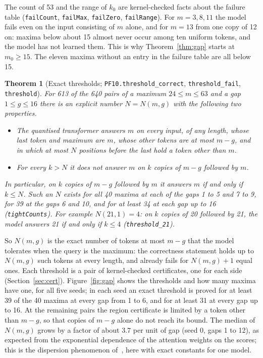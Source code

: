 \documentclass[11pt,a4paper]{article}
\newtheorem{theorem}{Theorem}
\newcommand{\lean}[1]{\texttt{#1}}
\begin{document}
The count of 53 and the range of $k_0$ are kernel-checked facts about the
failure table (\lean{failCount}, \lean{failMax}, \lean{failZero},
\lean{failRange}). For $m=3,8,11$ the model fails even on the input consisting
of $m$ alone, and for $m=13$ from one copy of 12 on: maxima below about 15
almost never occur among ten uniform tokens, and the model has not learned
them. This is why Theorem~\ref{thm:gap} starts at $m_0\ge15$. The eleven maxima
without an entry in the failure table are all below 15.

\begin{theorem}[Exact thresholds; \lean{PF10.threshold\_correct}, \lean{threshold\_fail}, \lean{threshold}]\label{thm:tight}
For 613 of the 640 pairs of a maximum $24\le m\le63$ and a gap $1\le g\le16$
there is an explicit number $N=N(m,g)$ with the following two properties.
\begin{itemize}
\item The quantised transformer answers $m$ on every input, of any length, whose
last token and maximum are $m$, whose other tokens are at most $m-g$, and in
which at most $N$ positions before the last hold a token other than $m$.
\item For every $k>N$ it does not answer $m$ on $k$ copies of $m-g$ followed by
$m$.
\end{itemize}
In particular, on $k$ copies of $m-g$ followed by $m$ it answers $m$ if and
only if $k\le N$. Such an $N$ exists for all 40 maxima at each of the gaps 1 to
5 and 7 to 9, for 39 at the gaps 6 and 10, and for at least 34 at each gap up
to 16 (\lean{tightCounts}). For example $N(21,1)=4$: on $k$ copies of 20
followed by 21, the model answers 21 if and only if $k\le4$
(\lean{threshold\_21}).
\end{theorem}

So $N(m,g)$ is the exact number of tokens at most $m-g$ that the model
tolerates when the query is the maximum: the correctness statement holds up to
$N(m,g)$ such tokens at every length, and already fails for $N(m,g)+1$ equal
ones. Each threshold is a pair of kernel-checked certificates, one for each
side (Section~\ref{sec:cert}). Figure~\ref{fig:gap} shows the thresholds and
how many maxima have one, for all five seeds; in each seed an exact threshold
is proved for at least 39 of the 40 maxima at every gap from 1 to 6, and for at
least 31 at every gap up to 16. At the remaining pairs the region certificate
is limited by a token other than $m-g$, so that copies of $m-g$ alone do not
reach its bound. The median of $N(m,g)$ grows by a factor of about $3.7$ per
unit of gap (seed 0, gaps 1 to 12), as expected from the exponential dependence
of the attention weights on the scores; this is the dispersion phenomenon
of~\cite{velickovic2025softmax}, here with exact constants for one model.
\end{document}

